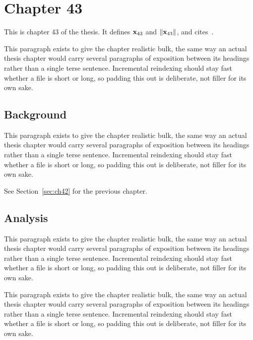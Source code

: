 \section{Chapter 43}
\label{sec:ch43}

This is chapter 43 of the thesis. It defines $\mathbf{x}_{43}$ and $\lVert \mathbf{x}_{43} \rVert$, and cites~\cite{ref1}.

This paragraph exists to give the chapter realistic bulk, the same way an actual thesis chapter would carry several paragraphs of exposition between its headings rather than a single terse sentence. Incremental reindexing should stay fast whether a file is short or long, so padding this out is deliberate, not filler for its own sake.

\subsection{Background}
\label{sec:ch43:background}

This paragraph exists to give the chapter realistic bulk, the same way an actual thesis chapter would carry several paragraphs of exposition between its headings rather than a single terse sentence. Incremental reindexing should stay fast whether a file is short or long, so padding this out is deliberate, not filler for its own sake.

See Section~\ref{sec:ch42} for the previous chapter.

\subsection{Analysis}
\label{sec:ch43:analysis}

This paragraph exists to give the chapter realistic bulk, the same way an actual thesis chapter would carry several paragraphs of exposition between its headings rather than a single terse sentence. Incremental reindexing should stay fast whether a file is short or long, so padding this out is deliberate, not filler for its own sake.

This paragraph exists to give the chapter realistic bulk, the same way an actual thesis chapter would carry several paragraphs of exposition between its headings rather than a single terse sentence. Incremental reindexing should stay fast whether a file is short or long, so padding this out is deliberate, not filler for its own sake.
